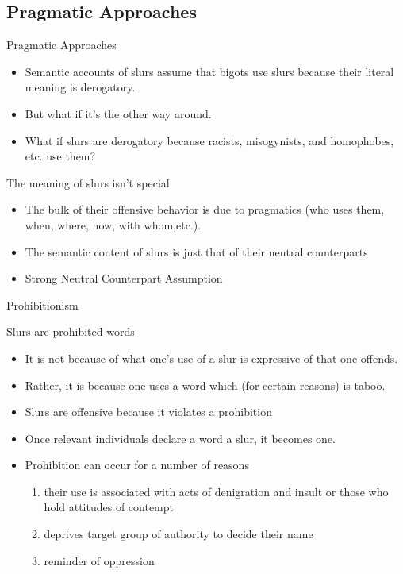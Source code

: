 \documentclass[xcolor=dvipsnames,12pt,handout]{beamer}
\begin{document}
\subsection{Pragmatic Approaches}
\begin{frame}{Pragmatic Approaches}
\vspace{-.4cm}
\pause
\begin{itemize}
\item Semantic accounts of slurs assume that bigots use slurs because their literal meaning is derogatory.
\pause
\item But what if it's the other way around.
\pause
\item What if slurs are derogatory because racists, misogynists, and homophobes, etc. use them?
\end{itemize}
\pause
\begin{block}{The meaning of slurs isn't special}
\begin{itemize}
\item The bulk of their offensive behavior is due to pragmatics (who uses them, when, where, how, with whom,etc.).
\pause
\item The semantic content of slurs is just that of their neutral counterparts 
\pause
\item Strong Neutral Counterpart Assumption
\end{itemize}
\end{block}


\end{frame}

\begin{frame}{Prohibitionism}

\begin{block}{Slurs are prohibited words}
\begin{itemize}
\pause
\item It is not because of what one's use of a slur is expressive of that one offends.
\pause
\item Rather, it is because one uses a word which (for certain reasons) is taboo.
\pause
\item Slurs are offensive because it violates a prohibition
\end{itemize}
\end{block}


\begin{itemize}

\pause
\item Once relevant individuals declare a word a slur, it becomes one.
\pause
\item Prohibition can occur for a number of reasons
\begin{enumerate}
\item their use is associated with acts of denigration and insult or those who hold attitudes of contempt
\pause
\item deprives target group of authority to decide their name
\pause
\item reminder of oppression
\end{enumerate}
\end{itemize}

\end{frame}
\end{document}
